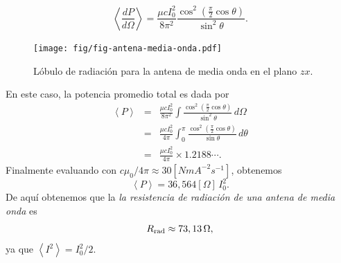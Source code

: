 \begin{equation}
 \left\langle\frac{dP}{d\Omega}\right\rangle=\frac{\mu c I_0^2}{8\pi^2}\frac{\cos^2\left(\frac{\pi}{2}\cos\theta\right)}{\sin^2\theta}.
\end{equation}
%
\begin{figure}[H]
\centerline{\texttt{[image: fig/fig-antena-media-onda.pdf]}}
 \caption{Lóbulo de radiación para la antena de media onda en el plano $zx$.}
\label{fig:lobulo_antena}
\end{figure}


En este caso, la potencia promedio total es dada por
\begin{eqnarray}
 \left\langle P\right\rangle
&=&\frac{\mu c I_0^2}{8\pi^2}\int\frac{\cos^2\left(\frac{\pi}{2}\cos\theta\right)}{\sin^2\theta}\,d\Omega \\
&=&\frac{\mu c I_0^2}{4\pi}\int_0^\pi\frac{\cos^2\left(\frac{\pi}{2}\cos\theta\right)}{\sin\theta}\,d\theta\\
&=&\frac{\mu c I_0^2}{4\pi}\times 1.2188\cdots .
\end{eqnarray}
Finalmente evaluando con $c\mu_0/4\pi\approx 30 [NmA^{-2}s^{-1}]$, obtenemos
\begin{equation}
 \left\langle P\right\rangle
=36,564[\Omega]\,I_0^2.
\end{equation}
De aquí obtenemos que la \textit{la resistencia de radiación de una antena de media onda} es
\begin{equation}
 R_{\rm rad}\approx 73,13\,\Omega,
\end{equation}
ya que $\left\langle I^2\right\rangle=I_0^2/2$.